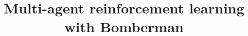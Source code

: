 

\setcounter{secnumdepth}{0}

\title{Multi-agent reinforcement learning with Bomberman} 
\date{\vspace{-10ex}}



\maketitle



